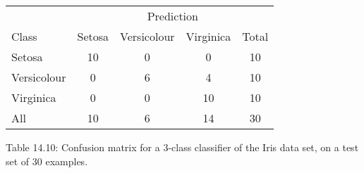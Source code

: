 \begin{table}
\begin{tabular}{l c c c c} \hline \hline  & \multicolumn{4}{c}{Prediction} \\ \cline{2-5} Class & Setosa & Versicolour & Virginica & Total \\ \hline Setosa & 10 & 0 & 0 & 10 \\ Versicolour & 0 & 6 & 4 & 10 \\ Virginica & 0 & 0 & 10 & 10 \\ All & 10 & 6 & 14 & 30 \\ \hline \hline \end{tabular}
\end{table}
Table 14.10: Confusion matrix for a \(3\)-class classifier of the Iris data set, on a test set of \(30\) examples.

